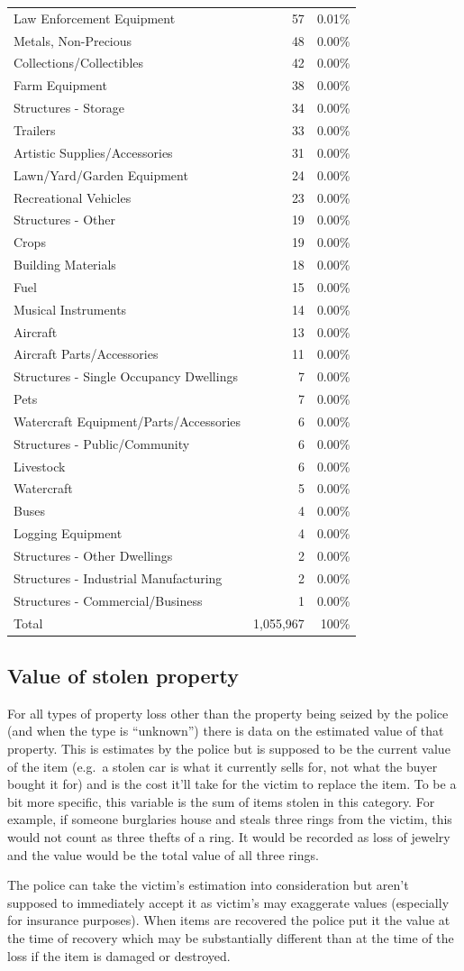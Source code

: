 \documentclass[
  12pt,
  openany]{book}
\begin{document}
\begin{longtable}[]{@{}lrr@{}}
Law Enforcement Equipment & 57 & 0.01\%\tabularnewline
Metals, Non-Precious & 48 & 0.00\%\tabularnewline
Collections/Collectibles & 42 & 0.00\%\tabularnewline
Farm Equipment & 38 & 0.00\%\tabularnewline
Structures - Storage & 34 & 0.00\%\tabularnewline
Trailers & 33 & 0.00\%\tabularnewline
Artistic Supplies/Accessories & 31 & 0.00\%\tabularnewline
Lawn/Yard/Garden Equipment & 24 & 0.00\%\tabularnewline
Recreational Vehicles & 23 & 0.00\%\tabularnewline
Structures - Other & 19 & 0.00\%\tabularnewline
Crops & 19 & 0.00\%\tabularnewline
Building Materials & 18 & 0.00\%\tabularnewline
Fuel & 15 & 0.00\%\tabularnewline
Musical Instruments & 14 & 0.00\%\tabularnewline
Aircraft & 13 & 0.00\%\tabularnewline
Aircraft Parts/Accessories & 11 & 0.00\%\tabularnewline
Structures - Single Occupancy Dwellings & 7 & 0.00\%\tabularnewline
Pets & 7 & 0.00\%\tabularnewline
Watercraft Equipment/Parts/Accessories & 6 & 0.00\%\tabularnewline
Structures - Public/Community & 6 & 0.00\%\tabularnewline
Livestock & 6 & 0.00\%\tabularnewline
Watercraft & 5 & 0.00\%\tabularnewline
Buses & 4 & 0.00\%\tabularnewline
Logging Equipment & 4 & 0.00\%\tabularnewline
Structures - Other Dwellings & 2 & 0.00\%\tabularnewline
Structures - Industrial Manufacturing & 2 & 0.00\%\tabularnewline
Structures - Commercial/Business & 1 & 0.00\%\tabularnewline
Total & 1,055,967 & 100\%\tabularnewline
\bottomrule
\end{longtable}

\hypertarget{value-of-stolen-property}{%
\subsection{Value of stolen property}\label{value-of-stolen-property}}

For all types of property loss other than the property being seized by the police (and when the type is ``unknown'') there is data on the estimated value of that property. This is estimates by the police but is supposed to be the current value of the item (e.g.~a stolen car is what it currently sells for, not what the buyer bought it for) and is the cost it'll take for the victim to replace the item. To be a bit more specific, this variable is the sum of items stolen in this category. For example, if someone burglaries house and steals three rings from the victim, this would not count as three thefts of a ring. It would be recorded as loss of jewelry and the value would be the total value of all three rings.

The police can take the victim's estimation into consideration but aren't supposed to immediately accept it as victim's may exaggerate values (especially for insurance purposes). When items are recovered the police put it the value at the time of recovery which may be substantially different than at the time of the loss if the item is damaged or destroyed.
\end{document}
